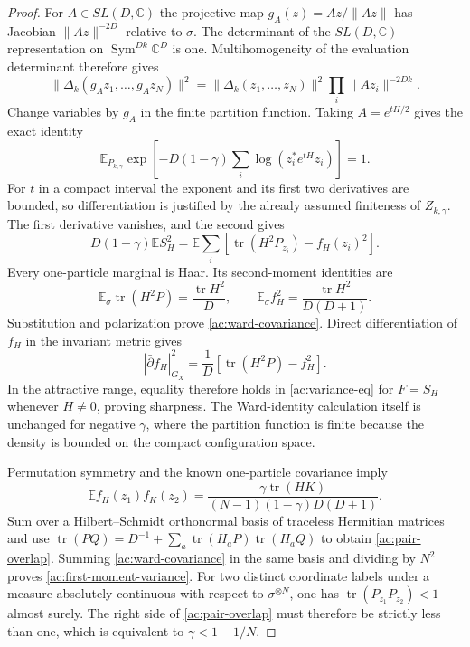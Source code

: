 \begin{proof}
For $A\in SL(D,\mathbb C)$ the projective map
$g_A(z)=Az/\|Az\|$ has Jacobian $\|Az\|^{-2D}$ relative to
$\sigma$.  The determinant of the $SL(D,\mathbb C)$ representation
on $\operatorname{Sym}^{Dk}\mathbb C^D$ is one.  Multihomogeneity
of the evaluation determinant therefore gives
\[
 \|\Delta_k(g_Az_1,\ldots,g_Az_N)\|^2
 =\|\Delta_k(z_1,\ldots,z_N)\|^2
                  \prod_i\|Az_i\|^{-2Dk}.
\]
Change variables by $g_A$ in the finite partition function.  Taking
$A=e^{tH/2}$ gives the exact identity
\begin{equation}
 \mathbb E_{P_{k,\gamma}}
 \exp\!\left[-D(1-\gamma)
       \sum_i\log(z_i^*e^{tH}z_i)\right]=1.
 \label{ac:ward-identity}
\end{equation}
For $t$ in a compact interval the exponent and its first two
derivatives are bounded, so differentiation is justified by the
already assumed finiteness of $Z_{k,\gamma}$.
The first derivative vanishes, and the second gives
\[
 D(1-\gamma)\mathbb E S_H^2
 =\mathbb E\sum_i
       \left[\operatorname{tr}(H^2P_{z_i})-f_H(z_i)^2\right].
\]
Every one-particle marginal is Haar.  Its second-moment identities are
\[
 \mathbb E_\sigma\operatorname{tr}(H^2P)=\frac{\operatorname{tr}H^2}{D},
 \qquad
 \mathbb E_\sigma f_H^2=\frac{\operatorname{tr}H^2}{D(D+1)}.
\]
Substitution and polarization prove \eqref{ac:ward-covariance}.
Direct differentiation of $f_H$ in the invariant metric gives
\[
 |\bar\partial f_H|_{G_X}^2
 =\frac1D\left[\operatorname{tr}(H^2P)-f_H^2\right].
\]
In the attractive range, equality therefore holds in
\eqref{ac:variance-eq} for $F=S_H$ whenever $H\ne0$, proving
sharpness.  The Ward-identity calculation itself is unchanged for
negative $\gamma$, where the partition function is finite because
the density is bounded on the compact configuration space.

Permutation symmetry and the known one-particle covariance imply
\[
 \mathbb E f_H(z_1)f_K(z_2)
 =\frac{\gamma\operatorname{tr}(HK)}
 {(N-1)(1-\gamma)D(D+1)}.
\]
Sum over a Hilbert--Schmidt orthonormal basis of traceless Hermitian
matrices and use
$\operatorname{tr}(PQ)=D^{-1}+\sum_a
\operatorname{tr}(H_aP)\operatorname{tr}(H_aQ)$ to obtain
\eqref{ac:pair-overlap}.  Summing \eqref{ac:ward-covariance} in the
same basis and dividing by $N^2$ proves
\eqref{ac:first-moment-variance}.  For two distinct coordinate labels
under a measure absolutely continuous with respect to
$\sigma^{\otimes N}$, one has
$\operatorname{tr}(P_{z_1}P_{z_2})<1$ almost surely.
The right side of \eqref{ac:pair-overlap} must therefore be strictly
less than one, which is equivalent to $\gamma<1-1/N$.
\end{proof}

